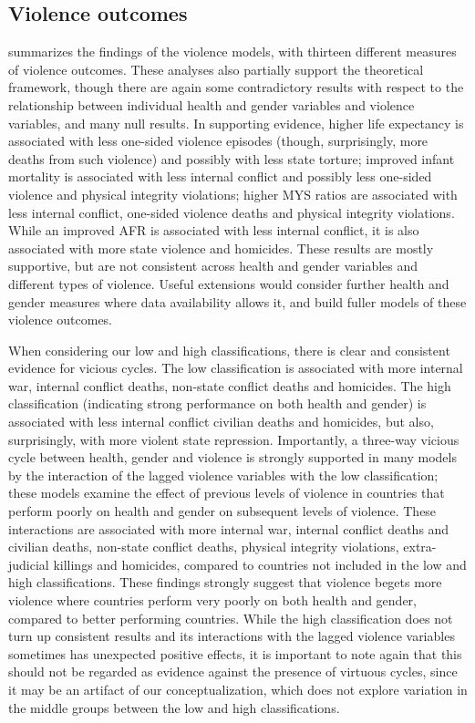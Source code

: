 \documentclass[12pt]{article}
\begin{document}


\subsection{Violence outcomes}

 summarizes the findings of the violence models, with thirteen different measures of violence outcomes.
These analyses also partially support the theoretical framework, though there are again some contradictory results with respect to the relationship between individual health and gender variables and violence variables, and many null results.
In supporting evidence, higher life expectancy is associated with less one-sided violence episodes (though, surprisingly, more deaths from such violence) and possibly with less state torture; improved infant mortality is associated with less internal conflict and possibly less one-sided violence and physical integrity violations; higher MYS ratios are associated with less internal conflict, one-sided violence deaths and physical integrity violations.
While an improved AFR is associated with less internal conflict, it is also associated with more state violence and homicides.
These results are mostly supportive, but are not consistent across health and gender variables and different types of violence.
Useful extensions would consider further health and gender measures where data availability allows it, and build fuller models of these violence outcomes.

When considering our low and high classifications, there is clear and consistent evidence for vicious cycles.
The low classification is associated with more internal war, internal conflict deaths, non-state conflict deaths and homicides.
The high classification (indicating strong performance on both health and gender) is associated with less internal conflict civilian deaths and homicides, but also, surprisingly, with more violent state repression.
Importantly, a three-way vicious cycle between health, gender and violence is strongly supported in many models by the interaction of the lagged violence variables with the low classification; these models examine the effect of previous levels of violence in countries that perform poorly on health and gender on subsequent levels of violence.
These interactions are associated with more internal war, internal conflict deaths and civilian deaths, non-state conflict deaths, physical integrity violations, extra-judicial killings and homicides, compared to countries not included in the low and high classifications.
These findings strongly suggest that violence begets more violence where countries perform very poorly on both health and gender, compared to better performing countries.
While the high classification does not turn up consistent results and its interactions with the lagged violence variables sometimes has unexpected positive effects, it is important to note again that this should not be regarded as evidence against the presence of virtuous cycles, since it may be an artifact of our conceptualization, which does not explore variation in the middle groups between the low and high classifications.
\end{document}
